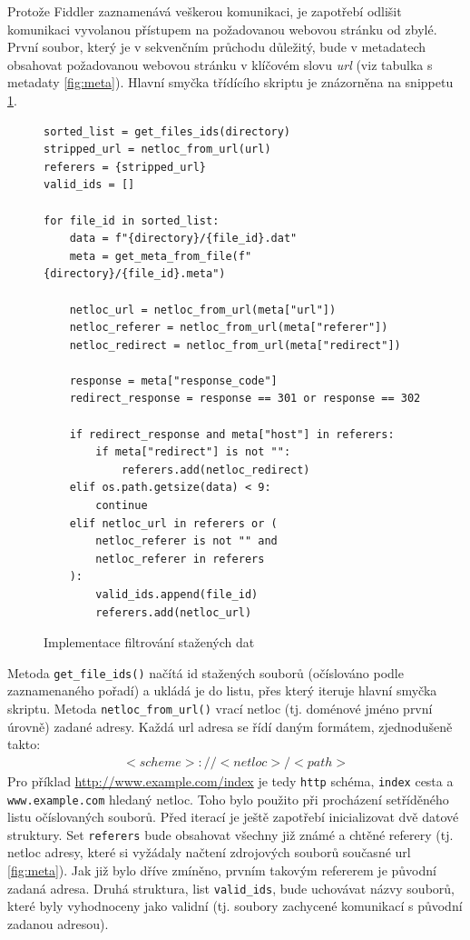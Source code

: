 \documentclass[thesis=M,czech,hidelinks]{FITthesis}[2013/05/06]
\begin{document}
Protože Fiddler zaznamenává veškerou komunikaci, je zapotřebí odlišit komunikaci vyvolanou přístupem na požadovanou webovou stránku od zbylé. První soubor, který je v sekvenčním průchodu důležitý, bude v metadatech obsahovat požadovanou webovou stránku v klíčovém slovu \textit{url} (viz tabulka s metadaty \ref{fig:meta}). Hlavní smyčka třídícího skriptu je znázorněna na snippetu \ref{snip:filter}. 

\begin{figure}[h]               
\begin{verbatim}
sorted_list = get_files_ids(directory)
stripped_url = netloc_from_url(url)
referers = {stripped_url}
valid_ids = []

for file_id in sorted_list:
    data = f"{directory}/{file_id}.dat"
    meta = get_meta_from_file(f"{directory}/{file_id}.meta")

    netloc_url = netloc_from_url(meta["url"])
    netloc_referer = netloc_from_url(meta["referer"])
    netloc_redirect = netloc_from_url(meta["redirect"])

    response = meta["response_code"]
    redirect_response = response == 301 or response == 302
    
    if redirect_response and meta["host"] in referers:
        if meta["redirect"] is not "":
            referers.add(netloc_redirect)
    elif os.path.getsize(data) < 9:
        continue
    elif netloc_url in referers or (
        netloc_referer is not "" and 
        netloc_referer in referers
    ):
        valid_ids.append(file_id)
        referers.add(netloc_url)

\end{verbatim}      
\caption{Implementace filtrování stažených dat}
\label{snip:filter}
\end{figure}

Metoda \texttt{get_file_ids()} načítá id stažených souborů (očíslováno podle zaznamenaného pořadí) a ukládá je do listu, přes který iteruje hlavní smyčka skriptu. Metoda \texttt{netloc_from_url()} vrací netloc (tj. doménové jméno první úrovně) zadané adresy. Každá url adresa se řídí daným formátem, zjednodušeně takto:
\begin{eqnarray}
<scheme>://<netloc>/<path>
\end{eqnarray}
Pro příklad \url{http://www.example.com/index} je tedy \texttt{http} schéma, \texttt{index} cesta a \texttt{www.example.com} hledaný netloc. Toho bylo použito při procházení setříděného listu očíslovaných souborů. Před iterací je ještě zapotřebí inicializovat dvě datové struktury. Set \texttt{referers} bude obsahovat všechny již známé a chtěné referery (tj. netloc adresy, které si vyžádaly načtení zdrojových souborů současné url \ref{fig:meta}). Jak již bylo dříve zmíněno, prvním takovým refererem je původní zadaná adresa. Druhá struktura, list \texttt{valid_ids}, bude uchovávat názvy souborů, které byly vyhodnoceny jako validní (tj. soubory zachycené komunikací s původní zadanou adresou).
\end{document}
